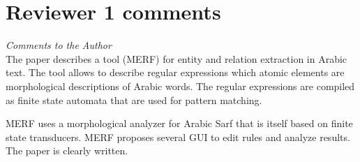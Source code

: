 \section*{Reviewer 1 comments}
\textit{Comments to the Author}\\


The paper describes a tool (MERF) for entity and relation 
extraction in Arabic text.
The tool allows to describe regular expressions which atomic 
elements are morphological descriptions of Arabic words.
The regular expressions are compiled as finite state 
automata that are used for pattern matching.

MERF uses a morphological analyzer for Arabic Sarf that 
is itself based on finite state transducers.
MERF proposes several GUI to edit rules and analyze results.
The paper is clearly written. 

\noindent{}

